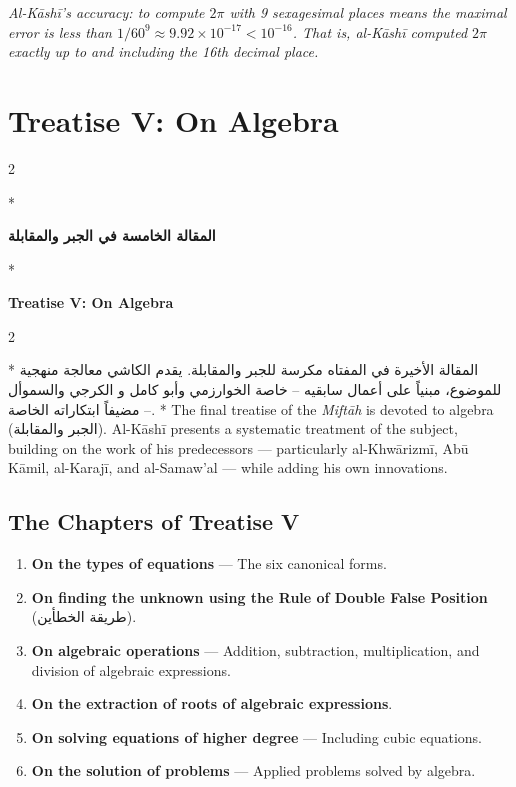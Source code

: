 \documentclass[11pt,a4paper]{article}
\newcommand{\cnote}[1]{\textcolor{notecolor}{\textit{#1}}}
\newcommand{\ar}[1]{\arabicfont\beginR #1\endR}
\newenvironment{bilingual}{%
  \vspace{0.3em}%
  \begin{paracol}{2}%
}{%
  \end{paracol}%
  \vspace{0.3em}%
}
\begin{document}
\cnote{Al-K\=ash\=i's accuracy: to compute $2\pi$ with 9 sexagesimal
places means the maximal error is less than $1/60^9 \approx 9.92 \times
10^{-17} < 10^{-16}$. That is, al-K\=ash\=i computed $2\pi$ exactly up to
and including the 16th decimal place.}
\clearpage

\section{Treatise V: On Algebra}
\label{sec:treatise5}

\begin{bilingual}
\switchcolumn[0]*
\begin{center}
\textbf{\Large\color{chapcolor}\ar{المقالة الخامسة في الجبر والمقابلة}}
\end{center}
\switchcolumn[1]*
\begin{center}
\textbf{\Large\color{chapcolor}Treatise V: On Algebra}
\end{center}
\end{bilingual}

\begin{bilingual}
\switchcolumn[0]*
\ar{المقالة الأخيرة في المفتاه مكرسة للجبر والمقابلة. يقدم الكاشي معالجة منهجية للموضوع، مبنياً على أعمال سابقيه -- خاصة الخوارزمي وأبو كامل و الكرجي والسموأل -- مضيفاً ابتكاراته الخاصة.}
\switchcolumn[1]*
The final treatise of the \textit{Mift\=ah} is devoted to algebra
(\ar{الجبر والمقابلة}). Al-K\=ash\=i presents a systematic treatment of
the subject, building on the work of his predecessors --- particularly
al-Khw\=arizm\=i, Ab\=u K\=amil, al-Karaj\=i, and al-Samaw'al --- while adding his
own innovations.
\end{bilingual}

\subsection{The Chapters of Treatise V}

\begin{enumerate}[label=\textbf{Ch.\arabic*:}]
  \item \textbf{On the types of equations} --- The six canonical forms.
  \item \textbf{On finding the unknown using the Rule of Double False
  Position} (\ar{طريقة الخطأين}).
  \item \textbf{On algebraic operations} --- Addition, subtraction,
  multiplication, and division of algebraic expressions.
  \item \textbf{On the extraction of roots of algebraic expressions}.
  \item \textbf{On solving equations of higher degree} --- Including
  cubic equations.
  \item \textbf{On the solution of problems} --- Applied problems solved
  by algebra.
\end{enumerate}
\end{document}
